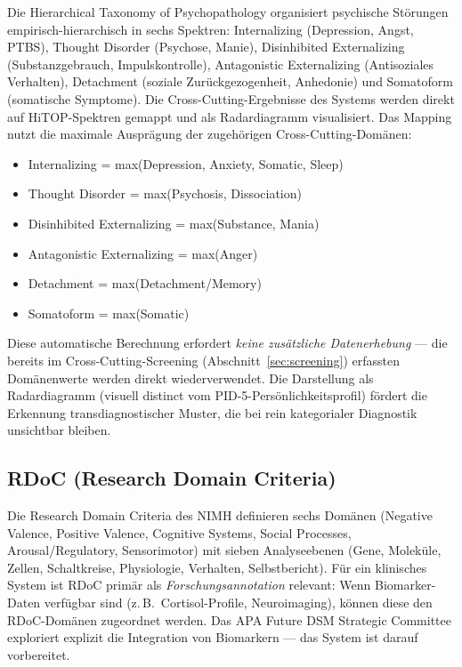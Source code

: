 \documentclass[11pt,a4paper]{article}
\begin{document}
Die Hierarchical Taxonomy of Psychopathology \citep{Kotov2017HiTOP} organisiert psychische St\"orungen empirisch-hierarchisch in sechs Spektren: Internalizing (Depression, Angst, PTBS), Thought Disorder (Psychose, Manie), Disinhibited Externalizing (Substanzgebrauch, Impulskontrolle), Antagonistic Externalizing (Antisoziales Verhalten), Detachment (soziale Zur\"uckgezogenheit, Anhedonie) und Somatoform (somatische Symptome). Die Cross-Cutting-Ergebnisse des Systems werden direkt auf HiTOP-Spektren gemappt und als Radardiagramm visualisiert. Das Mapping nutzt die maximale Auspr\"agung der zugeh\"origen Cross-Cutting-Dom\"anen:

\begin{itemize}[noitemsep]
\item Internalizing = max(Depression, Anxiety, Somatic, Sleep)
\item Thought Disorder = max(Psychosis, Dissociation)
\item Disinhibited Externalizing = max(Substance, Mania)
\item Antagonistic Externalizing = max(Anger)
\item Detachment = max(Detachment/Memory)
\item Somatoform = max(Somatic)
\end{itemize}

Diese automatische Berechnung erfordert \textit{keine zus\"atzliche Datenerhebung} --- die bereits im Cross-Cutting-Screening (Abschnitt~\ref{sec:screening}) erfassten Dom\"anenwerte werden direkt wiederverwendet. Die Darstellung als Radardiagramm (visuell distinct vom PID-5-Pers\"onlichkeitsprofil) f\"ordert die Erkennung transdiagnostischer Muster, die bei rein kategorialer Diagnostik unsichtbar bleiben.

\subsection{RDoC (Research Domain Criteria)}

Die Research Domain Criteria des NIMH \citep{Insel2010RDoC} definieren sechs Dom\"anen (Negative Valence, Positive Valence, Cognitive Systems, Social Processes, Arousal/Regulatory, Sensorimotor) mit sieben Analyseebenen (Gene, Molek\"ule, Zellen, Schaltkreise, Physiologie, Verhalten, Selbstbericht). F\"ur ein klinisches System ist RDoC prim\"ar als \textit{Forschungsannotation} relevant: Wenn Biomarker-Daten verf\"ugbar sind (z.\,B.\ Cortisol-Profile, Neuroimaging), k\"onnen diese den RDoC-Dom\"anen zugeordnet werden. Das APA Future DSM Strategic Committee exploriert explizit die Integration von Biomarkern --- das System ist darauf vorbereitet.
\end{document}
